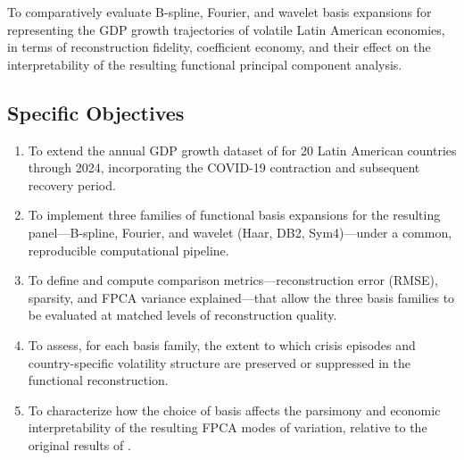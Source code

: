 To comparatively evaluate B-spline, Fourier, and wavelet basis expansions
for representing the GDP growth trajectories of volatile Latin American
economies, in terms of reconstruction fidelity, coefficient economy, and
their effect on the interpretability of the resulting functional
principal component analysis.

\subsection{Specific Objectives}

\begin{enumerate}
    \item To extend the annual GDP growth dataset of \cite{padilla2020}
    for 20 Latin American countries through 2024, incorporating the
    COVID-19 contraction and subsequent recovery period.

    \item To implement three families of functional basis expansions
    for the resulting panel---B-spline, Fourier, and wavelet (Haar, DB2,
    Sym4)---under a common, reproducible computational pipeline.

    \item To define and compute comparison metrics---reconstruction
    error (RMSE), sparsity, and FPCA variance explained---that allow the
    three basis families to be evaluated at matched levels of
    reconstruction quality.

    \item To assess, for each basis family, the extent to which crisis
    episodes and country-specific volatility structure are preserved or
    suppressed in the functional reconstruction.

    \item To characterize how the choice of basis affects the parsimony
    and economic interpretability of the resulting FPCA modes of
    variation, relative to the original results of \cite{padilla2020}.
\end{enumerate}


